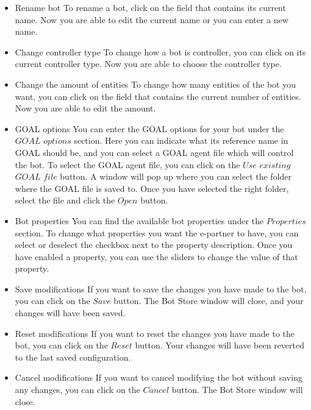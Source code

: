 \documentclass[11pt,a4paper]{article}
\begin{document}
\begin{itemize}

\item{Rename bot}
To rename a bot, click on the field that contains its current name. Now you are able to edit the current name or you can enter a new name.

\item{Change controller type}
To change how a bot is controller, you can click on its current controller type. Now you are able to choose the controller type.

\item{Change the amount of entities}
To change how many entities of the bot you want, you can click on the field that contains the current number of entities. Now you are able to edit the amount.

\item{GOAL options}
You can enter the GOAL options for your bot under the $GOAL$ $options$ section. Here you can indicate what its reference name in GOAL should be, and you can select a GOAL agent file which will control the bot. To select the GOAL agent file, you can click on the $Use$ $existing$ $GOAL$ $file$ button. A window will pop up where you can select the folder where the GOAL file is saved to. Once you have selected the right folder, select the file and click the $Open$ button.

\item{Bot properties}
You can find the available bot properties under the $Properties$ section. To change what properties you want the e-partner to have, you can select or deselect the checkbox next to the property description. Once you have enabled a property, you can use the sliders to change the value of that property.

\item{Save modifications}
If you want to save the changes you have made to the bot, you can click on the $Save$ button. The Bot Store window will close, and your changes will have been saved.

\item{Reset modifications}
If you want to reset the changes you have made to the bot, you can click on the $Reset$ button. Your changes will have been reverted to the last saved configuration.

\item{Cancel modifications}
If you want to cancel modifying the bot without saving any changes, you can click on the $Cancel$ button. The Bot Store window will close.
\end{itemize}
\end{document}
